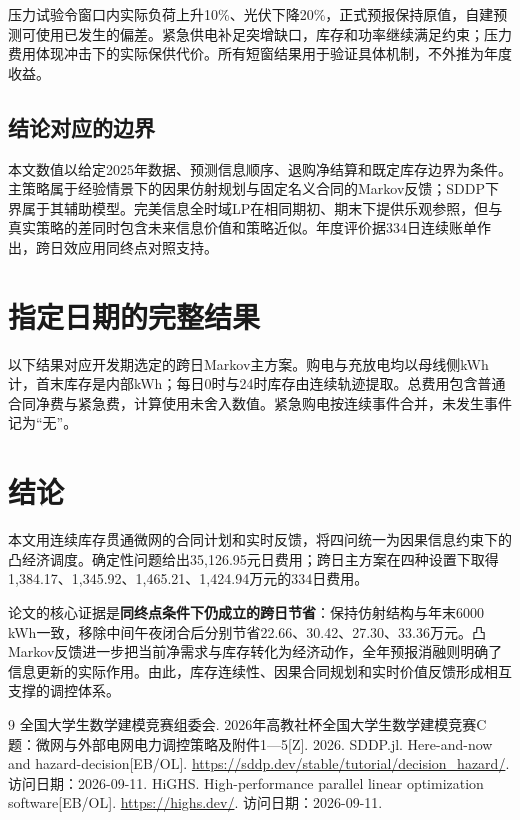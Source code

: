 \documentclass[UTF8,a4paper,zihao=-4,fontset=mac]{ctexart}
\begin{document}
压力试验令窗口内实际负荷上升10\%、光伏下降20\%，正式预报保持原值，自建预测可使用已发生的偏差。紧急供电补足突增缺口，库存和功率继续满足约束；压力费用体现冲击下的实际保供代价。所有短窗结果用于验证具体机制，不外推为年度收益。

\subsection{结论对应的边界}
本文数值以给定2025年数据、预测信息顺序、退购净结算和既定库存边界为条件。主策略属于经验情景下的因果仿射规划与固定名义合同的Markov反馈；SDDP下界属于其辅助模型。完美信息全时域LP在相同期初、期末下提供乐观参照，但与真实策略的差同时包含未来信息价值和策略近似。年度评价据334日连续账单作出，跨日效应用同终点对照支持。

\section{指定日期的完整结果}
以下结果对应开发期选定的跨日Markov主方案。购电与充放电均以母线侧kWh计，首末库存是内部kWh；每日0时与24时库存由连续轨迹提取。总费用包含普通合同净费与紧急费，计算使用未舍入数值。紧急购电按连续事件合并，未发生事件记为“无”。

\clearpage\section{结论}
本文用连续库存贯通微网的合同计划和实时反馈，将四问统一为因果信息约束下的凸经济调度。确定性问题给出35,126.95元日费用；跨日主方案在四种设置下取得1,384.17、1,345.92、1,465.21、1,424.94万元的334日费用。

论文的核心证据是\textbf{同终点条件下仍成立的跨日节省}：保持仿射结构与年末6000 kWh一致，移除中间午夜闭合后分别节省22.66、30.42、27.30、33.36万元。凸Markov反馈进一步把当前净需求与库存转化为经济动作，全年预报消融则明确了信息更新的实际作用。由此，库存连续性、因果合同规划和实时价值反馈形成相互支撑的调控体系。
\begin{thebibliography}{9}\small\linespread{1}\selectfont
{} 全国大学生数学建模竞赛组委会. 2026年高教社杯全国大学生数学建模竞赛C题：微网与外部电网电力调控策略及附件1—5[Z]. 2026.
 SDDP.jl. Here-and-now and hazard-decision[EB/OL]. \url{https://sddp.dev/stable/tutorial/decision_hazard/}. 访问日期：2026-09-11.
 HiGHS. High-performance parallel linear optimization software[EB/OL]. \url{https://highs.dev/}. 访问日期：2026-09-11.
\end{thebibliography}
\label{bodyend}
\clearpage\appendix
\end{document}
